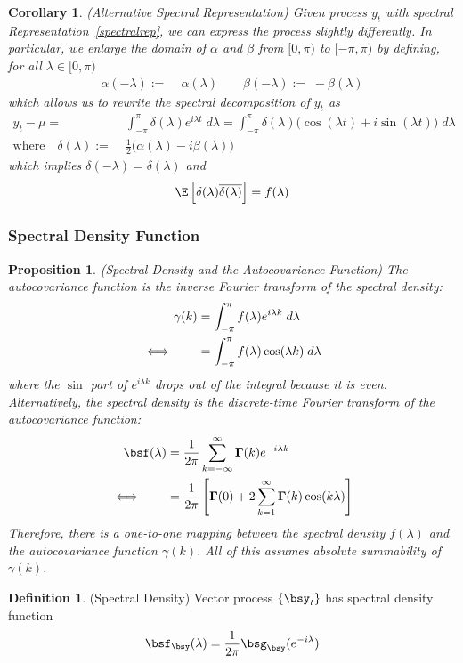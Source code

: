 \documentclass[12pt]{article}
\theoremstyle{plain}
\newtheorem{prop}[thm]{Proposition}
\newtheorem{cor}[thm]{Corollary}
\theoremstyle{definition}
\newtheorem{defn}[thm]{Definition}
\theoremstyle{remark}
\newcommand{\bsGamma}{\boldsymbol{\Gamma}}
\begin{document}
\begin{cor}(\emph{Alternative Spectral Representation})
Given process $y_t$ with spectral Representation~\ref{spectralrep}, we
can express the process slightly differently. In particular, we
enlarge the domain of $\alpha$ and $\beta$ from $[0,\pi)$ to
$[-\pi,\pi)$ by defining, for all $\lambda \in[0,\pi)$
\begin{align*}
  \alpha(-\lambda) :=& \;\alpha(\lambda)
  \qquad
  \beta(-\lambda) := \;-\beta(\lambda)
\end{align*}
which allows us to rewrite the spectral decomposition of $y_t$ as
\begin{align*}
  y_t-\mu =&\; \int_{-\pi}^\pi \delta(\lambda)e^{i\lambda t}\;d\lambda
  =\int_{-\pi}^\pi
  \delta(\lambda)\big(\cos(\lambda t)+i\sin(\lambda t)\big)\;d\lambda
  \\
  \text{where}\quad
  \delta(\lambda) :=& \;
    \frac{1}{2}\big(\alpha(\lambda)-i\beta(\lambda)\big)
\end{align*}
which implies $\delta(-\lambda)=\overline{\delta(\lambda)}$ and
\begin{align*}
\E\left[\delta(\lambda)\overline{\delta(\lambda)}\right] = f(\lambda)
\end{align*}
\end{cor}


\clearpage
\subsubsection{Spectral Density Function}

\begin{prop}\emph{(Spectral Density and the Autocovariance Function)}
The autocovariance function is the inverse Fourier transform of the
spectral density:
\begin{align}
  \gamma(k)
  &= \int_{-\pi}^\pi f(\lambda)e^{i\lambda k}\;d\lambda
  \label{inversefourier}
  \\
  \iff\qquad
  &= \int_{-\pi}^\pi f(\lambda)\cos(\lambda k)\;d\lambda
  \notag
\end{align}
where the $\sin$ part of $e^{i\lambda k}$ drops out of the integral
because it is even. Alternatively, the spectral density is the
discrete-time Fourier transform of the autocovariance function:
\begin{align}
  \bsf(\lambda)
  &= \frac{1}{2\pi} \sum_{k=-\infty}^\infty
  \bsGamma(k) e^{-i\lambda k}
  \label{fourier}
  \\
  \iff\qquad
  &= \frac{1}{2\pi}
  \left[
    \bsGamma(0) + 2\sum_{k=1}^\infty \bsGamma(k)\cos(k\lambda)
  \right]
  \notag
\end{align}
Therefore, there is a one-to-one mapping between the spectral density
$f(\lambda)$ and the autocovariance function $\gamma(k)$.
All of this assumes absolute summability of $\gamma(k)$.
\end{prop}
\begin{defn}(Spectral Density)
Vector process $\{\bsy_t\}$ has spectral density function
\begin{align*}
  \bsf_{\bsy}(\lambda) = \frac{1}{2\pi} \bsg_{\bsy}(e^{-i\lambda})
\end{align*}
\end{defn}
\end{document}
